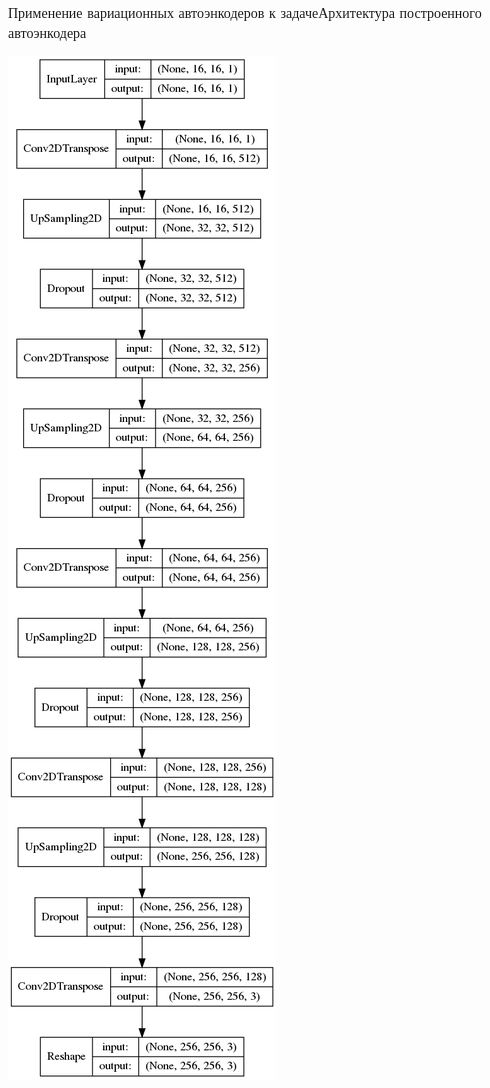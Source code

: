 \documentclass{beamer}
\begin{document}
\begin{frame}{Применение вариационных автоэнкодеров к задаче}{Архитектура построенного автоэнкодера}
\begin{minipage}{0.1\textwidth}
\begin{flushleft}
	\end{flushleft}
\end{minipage}
\hfill
\begin{minipage}{0.1\textwidth}
	\begin{center}
		\includegraphics[scale=0.12]{decoder}

\end{center}
\end{minipage}
\end{frame}
\end{document}
